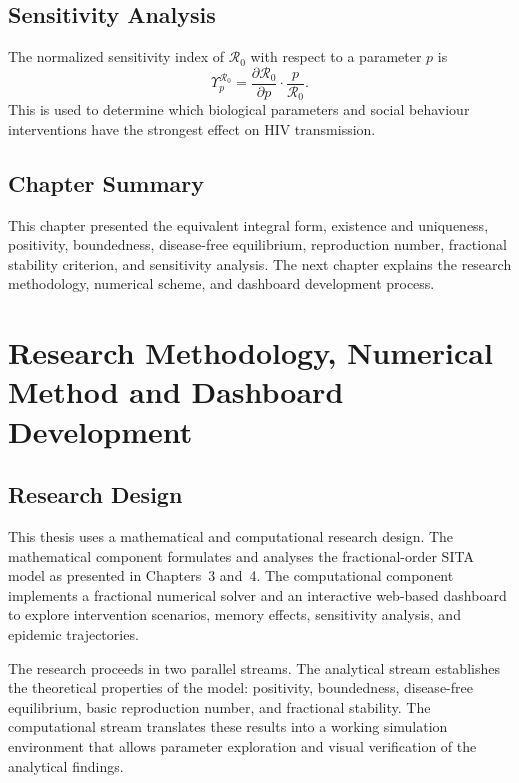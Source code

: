 \documentclass[12pt,a4paper,oneside]{report}
\newcommand{\Rzero}{\mathcal{R}_0}
\begin{document}
\section{Sensitivity Analysis}
The normalized sensitivity index of $\Rzero$ with respect to a parameter $p$ is
\begin{equation}
\Upsilon_p^{\Rzero}=\frac{\partial \Rzero}{\partial p}\cdot\frac{p}{\Rzero}.
\end{equation}
This is used to determine which biological parameters and social behaviour interventions have the strongest effect on HIV transmission.

\section{Chapter Summary}
This chapter presented the equivalent integral form, existence and uniqueness, positivity, boundedness, disease-free equilibrium, reproduction number, fractional stability criterion, and sensitivity analysis. The next chapter explains the research methodology, numerical scheme, and dashboard development process.

\chapter{Research Methodology, Numerical Method and Dashboard Development}

\section{Research Design}
This thesis uses a mathematical and computational research design. The mathematical component formulates and analyses the fractional-order SITA model as presented in Chapters~3 and~4. The computational component implements a fractional numerical solver and an interactive web-based dashboard to explore intervention scenarios, memory effects, sensitivity analysis, and epidemic trajectories.

The research proceeds in two parallel streams. The analytical stream establishes the theoretical properties of the model: positivity, boundedness, disease-free equilibrium, basic reproduction number, and fractional stability. The computational stream translates these results into a working simulation environment that allows parameter exploration and visual verification of the analytical findings.
\end{document}

